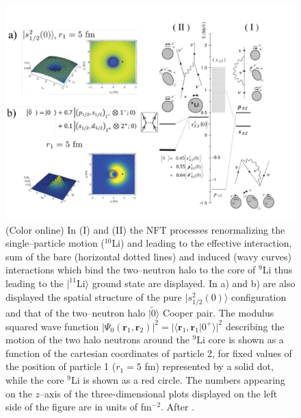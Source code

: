   \begin{figure}
  \centerline{\includegraphics*[width=\textwidth,angle=0]{nutshell/figs/fig1F3.pdf}}
  \caption{(Color online) In (I) and (II) the NFT processes renormalizing the single--particle motion ($^{10}$Li) and leading to the effective interaction, sum of the bare (horizontal dotted lines) and induced (wavy curves) interactions which bind the two--neutron halo to the core of $^{9}$Li  thus leading to the $|^{11}$Li$\rangle$ ground state are displayed. In a) and b) are also displayed the  spatial structure of the pure $|s_{1/2}^2(0)\rangle$ configuration and that of the two--neutron halo $|\tilde 0\rangle$ Cooper pair. The modulus squared wave function $|\Psi_0(\mathbf{r}_1,\mathbf{r}_2)|^2=|\langle \mathbf{r}_1,\mathbf{r}_1|0^+\rangle|^2$ describing the motion of the two halo neutrons around the $^9$Li core 
  is shown as a function of the cartesian coordinates of particle 2, for fixed values of the
  position of particle 1 ($r_1 = 5$ fm) represented  by a solid dot, while the core $^9$Li is shown as a red
  circle. The numbers appearing on the $z$--axis of the three-dimensional plots displayed on the left side of the figure are in units of fm$^{-2}$. After \cite{Barranco:01}.}\label{fig1F3}
  \end{figure}

